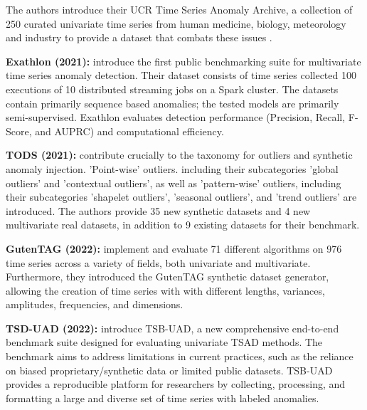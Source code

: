 \documentclass[12pt,oneside]{article}
\begin{document}
The authors introduce their UCR Time Series Anomaly Archive, a collection of 250 curated univariate time series from human medicine, biology, meteorology and industry to provide a dataset that combats these issues \parencite{wu2021current}. \par
\textbf{Exathlon (2021):} \cite{jacob2021exathlonbenchmarkexplainableanomaly} introduce the first public benchmarking suite for multivariate time series anomaly detection. Their dataset consists of time series collected 100 executions of 10 distributed streaming jobs on a Spark cluster. The datasets contain primarily sequence based anomalies; the tested models are primarily semi-supervised. Exathlon evaluates detection performance (Precision, Recall, F-Score, and AUPRC) and computational efficiency. \par
\textbf{TODS (2021):} \cite{NEURIPS} contribute crucially to the taxonomy for outliers and synthetic anomaly injection. 'Point-wise' outliers. including their subcategories 'global outliers' and 'contextual outliers', as well as 'pattern-wise' outliers, including their subcategories 'shapelet outliers', 'seasonal outliers', and 'trend outliers' are introduced. The authors provide 35 new synthetic datasets and 4 new multivariate real datasets, in addition to 9 existing datasets for their benchmark. \par
\textbf{GutenTAG (2022):} \cite{SchmidlEtAl2022Anomaly} implement and evaluate 71 different algorithms on 976 time series across a variety of fields, both univariate and multivariate. Furthermore, they introduced the GutenTAG synthetic dataset generator, allowing the creation of time series with with different lengths, variances, amplitudes, frequencies, and dimensions. \par
\textbf{TSD-UAD (2022):} \cite{paparrizos2022tsb} introduce TSB-UAD, a new comprehensive end-to-end benchmark suite designed for evaluating univariate TSAD methods. The benchmark aims to address limitations in current practices, such as the reliance on biased proprietary/synthetic data or limited public datasets. TSB-UAD provides a reproducible platform for researchers by collecting, processing, and formatting a large and diverse set of time series with labeled anomalies.
\end{document}
